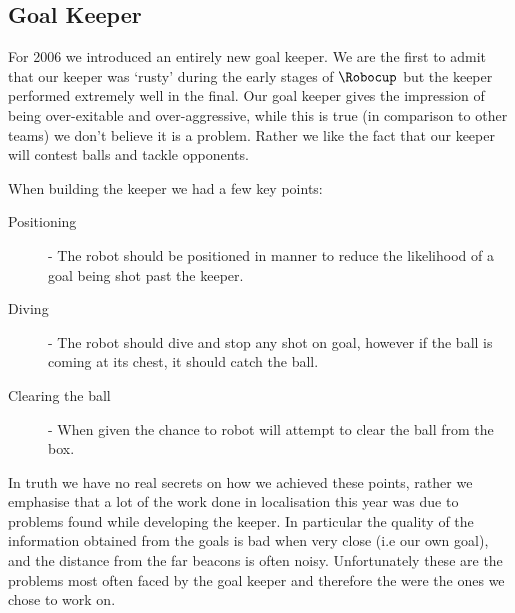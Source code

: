 \subsection{Goal Keeper}
\label{bvr:gk}
For 2006 we introduced an entirely new goal keeper. We are the first to admit that our keeper was `rusty' during the early stages of $\Robocup$ but the keeper performed extremely well in the final. Our goal keeper gives the impression of being over-exitable and over-aggressive, while this is true (in comparison to other teams) we don't believe it is a problem. Rather we like the fact that our keeper will contest balls and tackle opponents.

When building the keeper we had a few key points:
\begin{description}
    \item[Positioning] - The robot should be positioned in manner to reduce the likelihood of a goal being shot past the keeper.
    \item[Diving] - The robot should dive and stop any shot on goal, however if the ball is coming at its chest, it should catch the ball.
    \item[Clearing the ball] - When given the chance to robot will attempt to clear the ball from the box.
\end{description}

In truth we have no real secrets on how we achieved these points, rather we emphasise that a lot of the work done in localisation this year was due to problems found while developing the keeper. In particular the quality of the information obtained from the goals is bad when very close (i.e our own goal), and the distance from the far beacons is often noisy. Unfortunately these are the problems most often faced by the goal keeper and therefore the were the ones we chose to work on.
